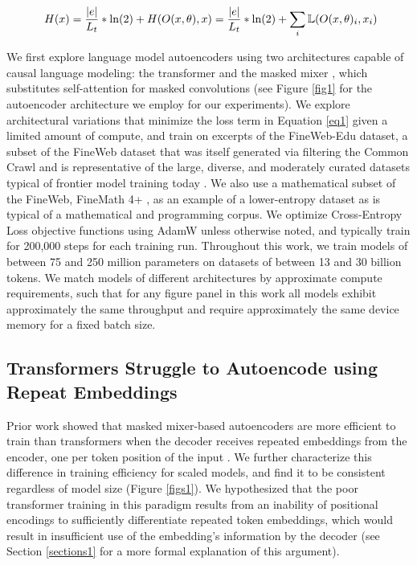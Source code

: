 \documentclass{article}
\begin{document}
    \begin{equation}\
    H(x) = \frac{|e|}{L_t} * \ln(2) + H(O(x, \theta), x) = \frac{|e|}{L_t} * \ln(2) + \sum_i \Bbb L(O(x, \theta)_i, x_i) 
    \label{eq1}
    \end{equation}
    
    We first explore language model autoencoders using two architectures capable of causal language modeling: the transformer \citep{vaswani2023attentionneed} and the masked mixer \citep{badger2025maskedmixerslanguagegeneration}, which substitutes self-attention for masked convolutions (see Figure \ref{fig1} for the autoencoder architecture we employ for our experiments). We explore architectural variations that minimize the loss term in Equation \ref{eq1} given a limited amount of compute, and train on excerpts of the FineWeb-Edu dataset, a subset of the FineWeb dataset that was itself generated via filtering the Common Crawl and is representative of the large, diverse, and moderately curated datasets typical of frontier model training today \citep{penedo2024finewebdatasetsdecantingweb}. We also use a mathematical subset of the FineWeb, FineMath 4+ \citep{allal2025smollm2smolgoesbig}, as an example of a lower-entropy dataset as is typical of a mathematical and programming corpus. We optimize Cross-Entropy Loss objective functions using AdamW \citep{loshchilov2019decoupledweightdecayregularization} unless otherwise noted, and typically train for 200,000 steps for each training run. Throughout this work, we train models of between 75 and 250 million parameters on datasets of between 13 and 30 billion tokens. We match models of different architectures by approximate compute requirements, such that for any figure panel in this work all models exhibit approximately the same throughput and require approximately the same device memory for a fixed batch size.
    
    \subsection{Transformers Struggle to Autoencode using Repeat Embeddings}
    
    Prior work showed that masked mixer-based autoencoders are more efficient to train than transformers when the decoder receives repeated embeddings from the encoder, one per token position of the input \citep{badger2025maskedmixerslanguagegeneration}. We further characterize this difference in training efficiency for scaled models, and find it to be consistent regardless of model size (Figure \ref{figs1}). We hypothesized that the poor transformer training in this paradigm results from an inability of positional encodings to sufficiently differentiate repeated token embeddings, which would result in insufficient use of the embedding's information by the decoder (see Section \ref{sections1} for a more formal explanation of this argument).
\end{document}
